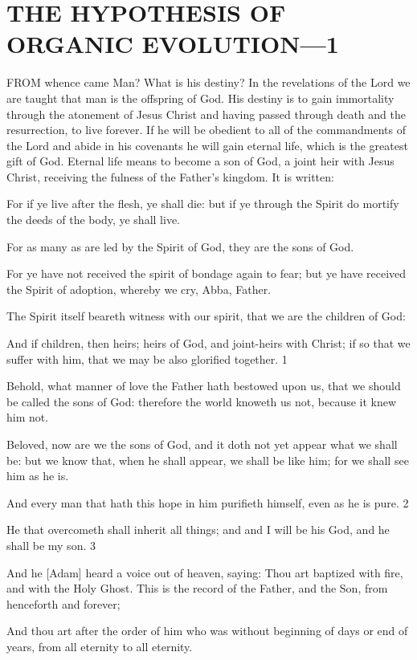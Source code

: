 \chapter{THE HYPOTHESIS OF ORGANIC EVOLUTION—1}

FROM whence came Man? What is his destiny? In the revelations of the Lord we are taught
that man is the offspring of God. His destiny is to gain immortality through the atonement of
Jesus Christ and having passed through death and the resurrection, to live forever. If he will
be obedient to all of the commandments of the Lord and abide in his covenants he will gain
eternal life, which is the greatest gift of God. Eternal life means to become a son of God, a
joint heir with Jesus Christ, receiving the fulness of the Father's kingdom. It is written:

For if ye live after the flesh, ye shall die: but if ye through the Spirit do mortify the deeds of
the body, ye shall live.

For as many as are led by the Spirit of God, they are the sons of God.

For ye have not received the spirit of bondage again to fear; but ye have received the Spirit of
adoption, whereby we cry, Abba, Father.

The Spirit itself beareth witness with our spirit, that we are the children of God:

And if children, then heirs; heirs of God, and joint-heirs with Christ; if so that we suffer with
him, that we may be also glorified together. 1

Behold, what manner of love the Father hath bestowed upon us, that we should be called the
sons of God: therefore the world knoweth us not, because it knew him not.

Beloved, now are we the sons of God, and it doth not yet appear what we shall be: but we
know that, when he shall appear, we shall be like him; for we shall see him as he is.

And every man that hath this hope in him purifieth himself, even as he is pure. 2

He that overcometh shall inherit all things; and and I will be his God, and he shall be my son.
3

And he [Adam] heard a voice out of heaven, saying: Thou art baptized with fire, and with the
Holy Ghost. This is the record of the Father, and the Son, from henceforth and forever;

And thou art after the order of him who was without beginning of days or end of years, from
all eternity to all eternity.

